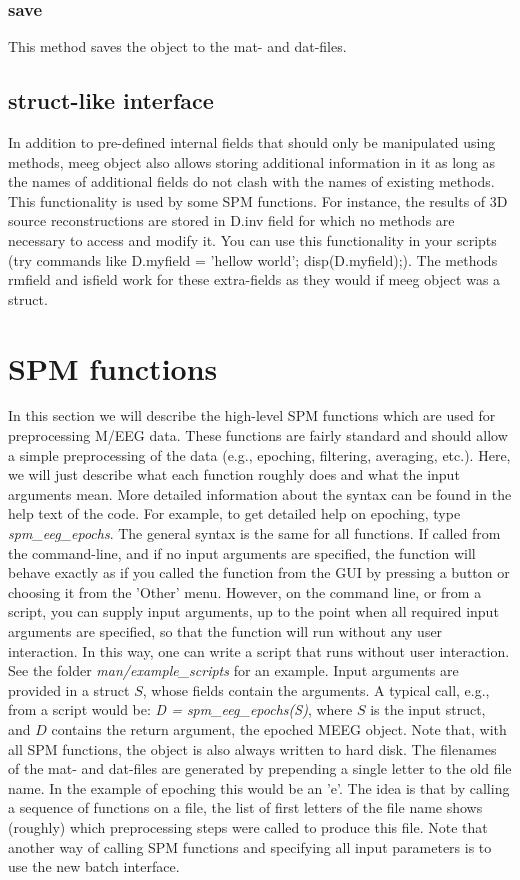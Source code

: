 \subsubsection{save}
This method saves the object to the mat- and dat-files.

\subsection{struct-like interface}
In addition to pre-defined internal fields that should only be manipulated
using methods, meeg object also allows storing additional information in it
as long as the names of additional fields do not clash with the names of existing methods.
This functionality is used by some SPM functions. For instance, the results of 3D source
reconstructions are stored in D.inv field for which no methods are necessary
to access and modify it. You can use this functionality in your scripts (try commands like 
D.myfield = 'hellow world'; disp(D.myfield);). The methods rmfield and isfield work for these
extra-fields as they would if meeg object was a struct.

\section{SPM functions}
In this section we will describe the high-level SPM functions which
are used for preprocessing M/EEG data. These functions are fairly
standard and should allow a simple preprocessing of the data (e.g.,
epoching, filtering, averaging, etc.). Here, we will just describe
what each function roughly does and what the input arguments mean. More detailed information about the
syntax can be found in the help text of the code. For example, to get detailed help on epoching, type
\textit{spm\_eeg\_epochs}. The general syntax is the same for all
functions. If called from the command-line, and if no input arguments
are specified, the function will behave exactly as if you called the
function from the GUI by pressing a button or choosing it from the 'Other' menu. However, on the command line, or from a script,
you can supply input arguments, up to the point when all required input
arguments are specified, so that the function will run without any user
interaction. In this way, one can write a script that runs without
user interaction. See the folder \textit{man/example\_scripts} for an example. Input
arguments are provided in a struct $S$, whose 
fields contain the arguments. A typical call, e.g., from a script
would be: \textit{D = spm\_eeg\_epochs(S)}, where $S$ is the input
struct, and $D$ contains the return argument, the epoched MEEG object. Note that, with all SPM
functions, the object is also always written to hard disk. The filenames of the mat- and dat-files 
are generated by prepending a single letter to the old file
name. In the example of epoching this would be an 'e'. The idea is that
by calling a sequence of functions on a file, the list of first
letters of the file name shows (roughly) which preprocessing steps were
called to produce this file. Note that another way of calling SPM
functions and specifying all input parameters is to use the new batch
interface.

